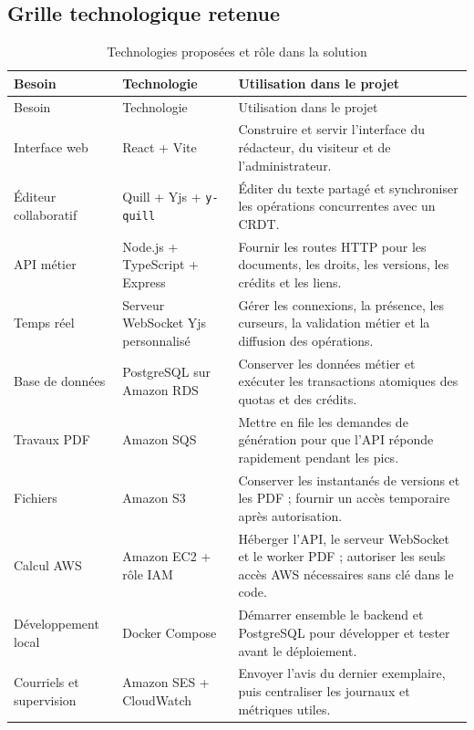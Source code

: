 \subsection{Grille technologique retenue}

\begingroup\small\setlength{\tabcolsep}{3pt}\renewcommand{\arraystretch}{1.25}
\begin{longtable}{|P{0.19\textwidth}|P{0.29\textwidth}|P{0.43\textwidth}|}
\caption{Technologies proposées et rôle dans la solution}\\
\hline
Besoin & Technologie & Utilisation dans le projet \\ \hline
\endfirsthead
\hline
Besoin & Technologie & Utilisation dans le projet \\ \hline
\endhead
\endfoot

Interface web & React + Vite & Construire et servir l'interface du rédacteur, du visiteur et de l'administrateur. \\ \hline

Éditeur collaboratif & Quill + Yjs + \texttt{y-quill} & Éditer du texte partagé et synchroniser les opérations concurrentes avec un CRDT. \\ \hline

API métier & Node.js + TypeScript + Express & Fournir les routes HTTP pour les documents, les droits, les versions, les crédits et les liens. \\ \hline

Temps réel & Serveur WebSocket Yjs personnalisé & Gérer les connexions, la présence, les curseurs, la validation métier et la diffusion des opérations. \\ \hline

Base de données & PostgreSQL sur Amazon RDS & Conserver les données métier et exécuter les transactions atomiques des quotas et des crédits. \\ \hline

Travaux PDF & Amazon SQS & Mettre en file les demandes de génération pour que l'API réponde rapidement pendant les pics. \\ \hline

Fichiers & Amazon S3 & Conserver les instantanés de versions et les PDF ; fournir un accès temporaire après autorisation. \\ \hline

Calcul AWS & Amazon EC2 + rôle IAM & Héberger l'API, le serveur WebSocket et le worker PDF ; autoriser les seuls accès AWS nécessaires sans clé dans le code. \\ \hline

Développement local & Docker Compose & Démarrer ensemble le backend et PostgreSQL pour développer et tester avant le déploiement. \\ \hline

Courriels et supervision & Amazon SES + CloudWatch & Envoyer l'avis du dernier exemplaire, puis centraliser les journaux et métriques utiles. \\ \hline

\end{longtable}\endgroup


